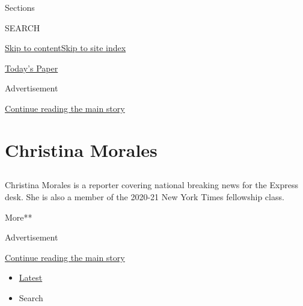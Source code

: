 Sections

SEARCH

\protect\hyperlink{site-content}{Skip to
content}\protect\hyperlink{site-index}{Skip to site index}

\href{https://myaccount.nytimes.com/auth/login?response_type=cookie\&client_id=vi}{}

\href{https://www.nytimes.com/section/todayspaper}{Today's Paper}

Advertisement

\protect\hyperlink{after-top}{Continue reading the main story}

\hypertarget{christina-morales}{%
\section{Christina Morales}\label{christina-morales}}

\subsection{}

Christina Morales is a reporter covering national breaking news for the
Express desk. She is also a member of the 2020-21 New York Times
fellowship class.

More**

Advertisement

\protect\hyperlink{after-mid1}{Continue reading the main story}

\begin{itemize}
\tightlist
\item
  \protect\hyperlink{stream-panel}{Latest}
\item
  Search
\end{itemize}

